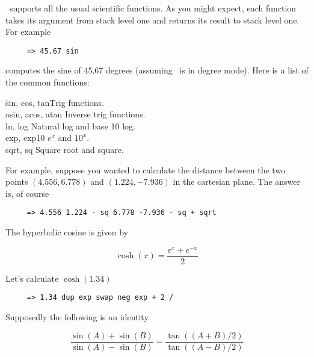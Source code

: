 \documentclass{report}
\begin{document}
\CLAC\ supports all the usual scientific functions. As you might expect, each function takes its
argument from stack level one and returns its result to stack level one. For example

\begin{verbatim}
     => 45.67 sin
\end{verbatim}

computes the sine of 45.67 degrees (assuming \CLAC\ is in degree mode). Here is a list of the
common functions:

\begin{tabbing}

\hspace*{3em}\=sin, cos, tan\hspace{5em}\=Trig functions.\\
\>             asin, acos, atan\>         Inverse trig functions.\\
\>             ln, log\>                  Natural log and base 10 log.\\
\>             exp, exp10\>               $e^{x}$ and $10^{x}$.\\
\>             sqrt, sq\>                 Square root and square.\\

\end{tabbing}

For example, suppose you wanted to calculate the distance between the two points $(4.556,
6.778)$ and $(1.224, -7.936)$ in the cartesian plane. The answer is, of course

\begin{verbatim}
     => 4.556 1.224 - sq 6.778 -7.936 - sq + sqrt
\end{verbatim}

The hyperbolic cosine is given by

\begin{displaymath}
     \cosh (x) = \frac{ e^{x} + e^{-x} }{ 2 }
\end{displaymath}

Let's calculate $\cosh(1.34)$

\begin{verbatim}
     => 1.34 dup exp swap neg exp + 2 /
\end{verbatim}

Supposedly the following is an identity

\begin{displaymath}
     \frac { \sin(A) + \sin(B) }{ \sin(A) - \sin(B) } =
       \frac { \tan((A+B)/2) }{ \tan((A-B)/2) }
\end{displaymath}
\end{document}
